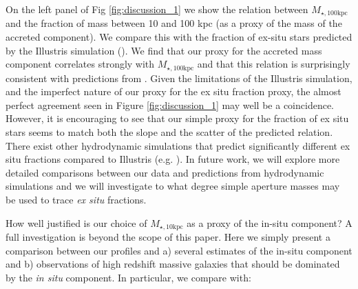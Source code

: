 \documentclass[a4paper,fleqn,usenatbib]{mnras}
\def\rbcg{\texttt{cenHighMh}}
\def\nbcg{\texttt{cenLowMh}}
\def\mstar{{$M_{\star}$}}
\def\mhalo{{$M_{\mathrm{200b}}$}}
\def\logms{{$\log (M_{\star}/M_{\odot})$}}
\def\minn{{$M_{\star,10\mathrm{kpc}}$}}
\def\mtot{{$M_{\star,100\mathrm{kpc}}$}}
\def\mden{{$\mu_{\star}$}}
\begin{document}
    On the left panel of Fig \ref{fig:discussion_1} we show the relation between \mtot{} and the fraction of mass between 10 and 100 kpc (as a proxy of the mass of the accreted component). We compare this with the  fraction of ex-situ stars predicted by the Illustris simulation 
    (\citealt{RodriguezGomez2016}).  We find that  our proxy for the accreted mass component correlates strongly with  \mtot{} and that this relation is surprisingly consistent with predictions from \citet{RodriguezGomez2016}.  Given the limitations of the Illustris simulation, and the imperfect nature of our proxy for the ex situ fraction proxy, the almost perfect agreement seen in Figure \ref{fig:discussion_1} may well be a coincidence.  However, it is encouraging to see that our simple proxy for the fraction of ex situ stars seems to match both the slope and the scatter of the predicted relation.  There exist other  hydrodynamic simulations that predict significantly different ex situ fractions compared to Illustris (e.g. 
    \citealt{Lackner2012, Qu2017}).  In future work, we will explore more detailed comparisons between our data and predictions from hydrodynamic simulations and we will  investigate to what degree simple aperture masses may be used to trace \textit{ex situ} fractions. 
    
   
   How well justified is our choice of  \minn{} as a proxy of the  in-situ component?  A full investigation is beyond the scope of this paper. Here we simply present a comparison  between our profiles and  a)  several estimates of the in-situ component and b) observations of high redshift massive galaxies that should be dominated by the  \textit{in situ} component.  In particular, we compare with:
  
\end{document}
